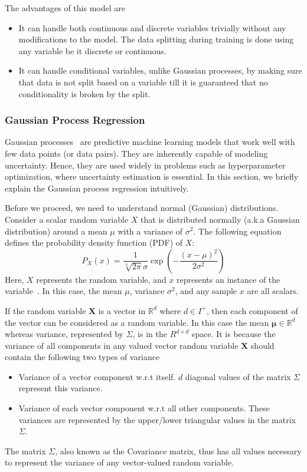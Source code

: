 \documentclass[11pt]{report}
\begin{document}
   The advantages of this model are
   \begin{itemize}
   \item It can handle both continuous and discrete variables trivially without any modifications to the model.
The data splitting during training is done using any variable be it discrete or continuous.
	\item It can handle conditional variables, unlike Gaussian processes, by making sure that data is not split based on a variable till it is guaranteed that no conditionality is broken by the split.
   \end{itemize}

\subsubsection{Gaussian Process Regression}

Gaussian processes~\cite{GPTutorial} are predictive machine learning models that work well with few data points (or data pairs). 
They are inherently capable of modeling uncertainty.
Hence, they are used widely in problems such as hyperparameter optimization, where uncertainty estimation is essential.
In this section, we briefly explain the Gaussian process regression intuitively.

Before we proceed,  we need to understand normal (Gaussian) distributions. 
Consider a scalar random variable $X$ that is distributed normally  (a.k.a Gaussian distribution) around a mean $\mu$ with a variance of $\sigma^2$.
The following equation defines the probability density function (PDF) of $X$: 
$$
P_X(x) = \frac{1}{\sqrt[2]{2\pi}\sigma}\exp\left(- \frac{(x - \mu)^2}{2\sigma^2}\right)
$$
Here, $X$ represents the random variable, and $x$ represents an instance of the variable~\cite{GPTutorial}.
In this case,  the mean $\mu$,  variance $\sigma^2$, and any sample $x$ are all scalars.

If the random variable $\textbf{X}$ is a vector in $\mathbb{R}^d$ where $d \in I^{+}$,  then each component of the vector can be considered as a random variable.
In this case the mean $\boldsymbol{\mu} \in \mathbb{R}^d$ whereas variance, represented by $\Sigma$, is in the $R^{d \times d}$ space.
It is because the variance of all components in any valued vector random variable $\textbf{X}$ should contain the following two types of variance
\begin{itemize}
\item Variance of a vector component w.r.t itself.
$d$ diagonal values of the matrix $\Sigma$ represent this variance.
\item Variance of each vector component w.r.t all other components. These variances are represented by the upper/lower triangular values in the matrix $\Sigma$.
\end{itemize}
The matrix $\Sigma$, also known as the Covariance matrix, thus has all values necessary to represent the variance of any vector-valued random variable.
\end{document}
